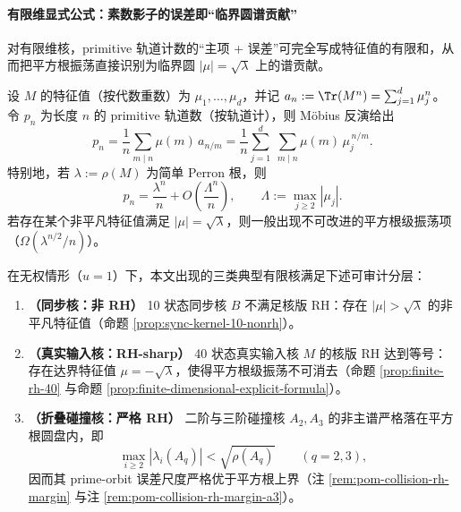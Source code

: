 \paragraph{有限维显式公式：素数影子的误差即“临界圆谱贡献”}\label{par:finite-explicit-formula}
对有限维核，primitive 轨道计数的“主项 + 误差”可完全写成特征值的有限和，从而把平方根振荡直接识别为临界圆 \(|\mu|=\sqrt{\lambda}\) 上的谱贡献。
\begin{remark}[有限维显式公式模板]\label{prop:finite-dimensional-explicit-formula}
设 \(M\) 的特征值（按代数重数）为 \(\mu_1,\dots,\mu_d\)，并记
\(
a_n:=\Tr(M^n)=\sum_{j=1}^d \mu_j^n
\)。
令 \(p_n\) 为长度 \(n\) 的 primitive 轨道数（按轨道计），则 Möbius 反演给出
\[
p_n=\frac{1}{n}\sum_{m\mid n}\mu(m)\,a_{n/m}
=\frac{1}{n}\sum_{j=1}^d\ \sum_{m\mid n}\mu(m)\,\mu_j^{\,n/m}.
\]
特别地，若 \(\lambda:=\rho(M)\) 为简单 Perron 根，则
\[
p_n=\frac{\lambda^n}{n}+O\!\left(\frac{\Lambda^n}{n}\right),
\qquad
\Lambda:=\max_{j\ge 2}|\mu_j|.
\]
若存在某个非平凡特征值满足 \(|\mu|=\sqrt{\lambda}\)，则一般出现不可改进的平方根级振荡项（\(\Omega(\lambda^{n/2}/n)\)）。
\end{remark}

\begin{proposition}\label{prop:rh-stratification-three-kernels}
在无权情形（$u=1$）下，本文出现的三类典型有限核满足下述可审计分层：
\begin{enumerate}
  \item \textbf{（同步核：非 RH）} 10 状态同步核 $B$ 不满足核版 RH：存在 \(|\mu|>\sqrt{\lambda}\) 的非平凡特征值（命题 \ref{prop:sync-kernel-10-nonrh}）。
  \item \textbf{（真实输入核：RH-sharp）} 40 状态真实输入核 $M$ 的核版 RH 达到等号：存在达界特征值 \(\mu=-\sqrt{\lambda}\)，使得平方根级振荡不可消去（命题 \ref{prop:finite-rh-40} 与命题 \ref{prop:finite-dimensional-explicit-formula}）。
  \item \textbf{（折叠碰撞核：严格 RH）} 二阶与三阶碰撞核 \(A_2,A_3\) 的非主谱严格落在平方根圆盘内，即
  \[
  \max_{i\ge 2}|\lambda_i(A_q)|<\sqrt{\rho(A_q)}\qquad(q=2,3),
  \]
  因而其 prime-orbit 误差尺度严格优于平方根上界（注 \ref{rem:pom-collision-rh-margin} 与注 \ref{rem:pom-collision-rh-margin-a3}）。
\end{enumerate}
\end{proposition}

